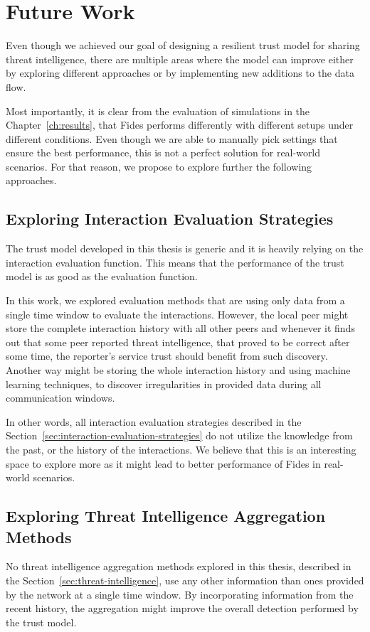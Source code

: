\section{Future Work}
\label{sec:future-work}
Even though we achieved our goal of designing a resilient trust model for sharing threat intelligence, there are multiple areas where the model can improve either by exploring different approaches or by implementing new additions to the data flow.

Most importantly, it is clear from the evaluation of simulations in the Chapter~\ref{ch:results}, that Fides performs differently with different setups under different conditions.
Even though we are able to manually pick settings that ensure the best performance, this is not a perfect solution for real-world scenarios.
For that reason, we propose to explore further the following approaches.

\subsection{Exploring Interaction Evaluation Strategies}
\label{subsec:exploring-interaction-eval-strategies}
The trust model developed in this thesis is generic and it is heavily relying on the interaction evaluation function.
This means that the performance of the trust model is as good as the evaluation function.

In this work, we explored evaluation methods that are using only data from a single time window to evaluate the interactions.
However, the local peer might store the complete interaction history with all other peers and whenever it finds out that some peer reported threat intelligence, that proved to be correct after some time, the reporter's service trust should benefit from such discovery.
Another way might be storing the whole interaction history and using machine learning techniques, to discover irregularities in provided data during all communication windows.

In other words, all interaction evaluation strategies described in the Section~\ref{sec:interaction-evaluation-strategies} do not utilize the knowledge from the past, or the history of the interactions.
We believe that this is an interesting space to explore more as it might lead to better performance of Fides in real-world scenarios.

\subsection{Exploring Threat Intelligence Aggregation Methods}
\label{subsec:exploring-threat-intelligence-aggregation-methods}
No threat intelligence aggregation methods explored in this thesis, described in the Section~\ref{sec:threat-intelligence}, use any other information than ones provided by the network at a single time window.
By incorporating information from the recent history, the aggregation might improve the overall detection performed by the trust model.

